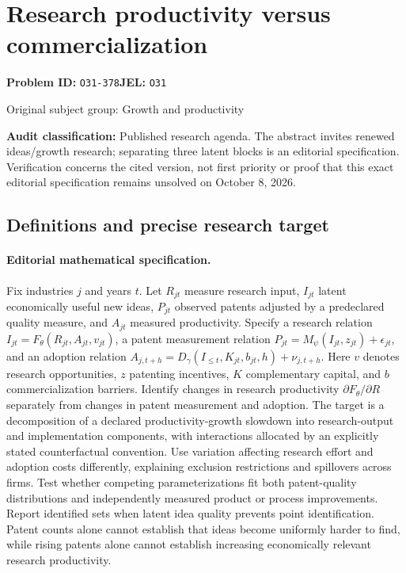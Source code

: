 \documentclass[11pt,a4paper]{article}
\begin{document}
\section*{Research productivity versus commercialization}
\textbf{Problem ID:} \texttt{O31-378}\quad \textbf{JEL:} \texttt{O31}\par
\label{problem:OP-0261}
{\sffamily\small\color{muted}Original subject group: Growth and productivity\par}
\label{definitions:problem:30007542}
\textbf{Audit classification:} Published research agenda. The abstract invites renewed ideas/growth research; separating three latent blocks is an editorial specification. Verification concerns the cited version, not first priority or proof that this exact editorial specification remains unsolved on October 8, 2026.
\subsection*{Definitions and precise research target}
\paragraph{Editorial mathematical specification.} Fix industries \(j\) and years \(t\). Let \(R_{jt}\) measure research input, \(I_{jt}\) latent economically useful new ideas, \(P_{jt}\) observed patents adjusted by a predeclared quality measure, and \(A_{jt}\) measured productivity. Specify a research relation \(I_{jt}=F_\theta(R_{jt},A_{jt},v_{jt})\), a patent measurement relation \(P_{jt}=M_\psi(I_{jt},z_{jt})+\epsilon_{jt}\), and an adoption relation \(A_{j,t+h}=D_\gamma(I_{\le t},K_{jt},b_{jt},h)+\nu_{j,t+h}\). Here \(v\) denotes research opportunities, \(z\) patenting incentives, \(K\) complementary capital, and \(b\) commercialization barriers.
Identify changes in research productivity \(\partial F_\theta/\partial R\) separately from changes in patent measurement and adoption. The target is a decomposition of a declared productivity-growth slowdown into research-output and implementation components, with interactions allocated by an explicitly stated counterfactual convention. Use variation affecting research effort and adoption costs differently, explaining exclusion restrictions and spillovers across firms. Test whether competing parameterizations fit both patent-quality distributions and independently measured product or process improvements. Report identified sets when latent idea quality prevents point identification. Patent counts alone cannot establish that ideas become uniformly harder to find, while rising patents alone cannot establish increasing economically relevant research productivity.
\end{document}
